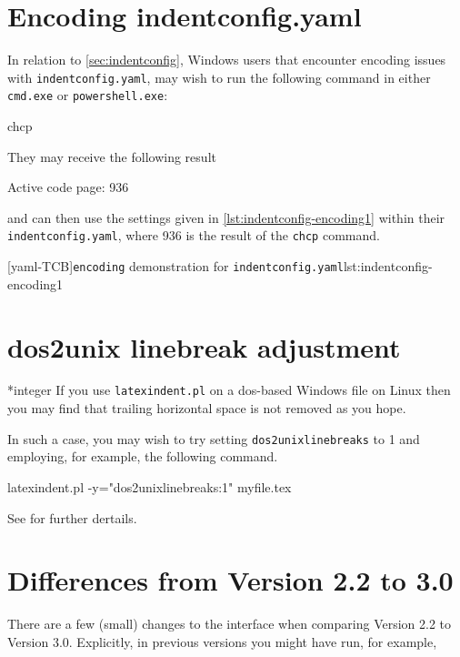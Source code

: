  \section{Encoding indentconfig.yaml}\label{app:encoding}
  In relation to \vref{sec:indentconfig}, Windows users that encounter encoding issues with
  \texttt{indentconfig.yaml}, may wish to run the following command in either
  \texttt{cmd.exe} or \texttt{powershell.exe}:
  \begin{dosprompt}
chcp
    \end{dosprompt}
  They may receive the following result
  \begin{dosprompt}
Active code page: 936
    \end{dosprompt}
  and can then use the settings given in \cref{lst:indentconfig-encoding1} within their
  \texttt{indentconfig.yaml}, where 936 is the result of the \texttt{chcp} command.

  [yaml-TCB]{\texttt{encoding} demonstration for \texttt{indentconfig.yaml}}{lst:indentconfig-encoding1}

 \section{dos2unix linebreak adjustment}

 *{integer}
  If you use \texttt{latexindent.pl} on a dos-based Windows file on Linux
   then you may find that trailing horizontal
  space is not removed as you hope.

  In such a case, you may wish to try setting \texttt{dos2unixlinebreaks} to 1 and
  employing, for example, the following command.

  \begin{commandshell}
latexindent.pl -y="dos2unixlinebreaks:1" myfile.tex
\end{commandshell}

  See \cite{bersbersbers} for further dertails.

 \section{Differences from Version 2.2 to 3.0}\label{app:differences}
  There are a few (small) changes to the interface when comparing Version 2.2 to Version
  3.0. Explicitly, in previous versions you might have run, for example, 

